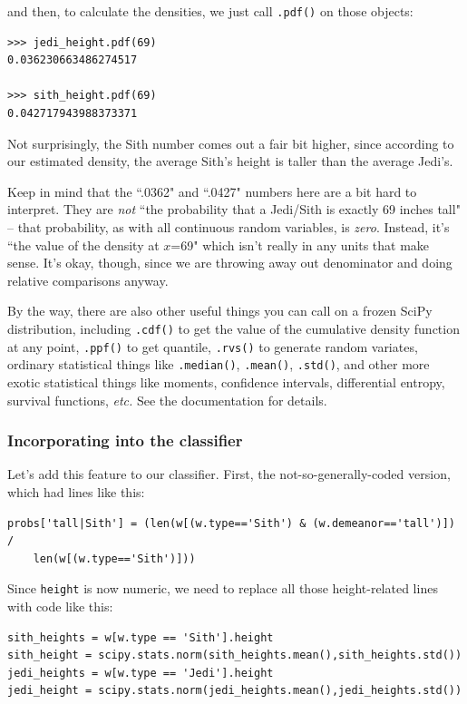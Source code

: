 \documentclass[12pt]{article}
\begin{document}
and then, to calculate the densities, we just call \texttt{.pdf()} on those
objects:

\begin{Verbatim}[fontsize=\small,samepage=true,frame=none]
>>> jedi_height.pdf(69)
0.036230663486274517

>>> sith_height.pdf(69)
0.042717943988373371
\end{Verbatim}

Not surprisingly, the Sith number comes out a fair bit higher, since according
to our estimated density, the average Sith's height is taller than the average
Jedi's.

Keep in mind that the ``.0362" and ``.0427" numbers here are a bit hard to
interpret. They are \textit{not} ``the probability that a Jedi/Sith is exactly
69 inches tall" -- that probability, as with all continuous random variables,
is \textit{zero}. Instead, it's ``the value of the density at $x$=69" which
isn't really in any units that make sense. It's okay, though, since we are
throwing away out denominator and doing relative comparisons anyway.

By the way, there are also other useful things you can call on a frozen SciPy
distribution, including \texttt{.cdf()} to get the value of the cumulative
density function at any point, \texttt{.ppf()} to get quantile,
\texttt{.rvs()} to generate random variates, ordinary statistical things like
\texttt{.median()}, \texttt{.mean()}, \texttt{.std()}, and other more exotic
statistical things like moments, confidence intervals, differential entropy,
survival functions, \textit{etc.} See the documentation for details.

\subsubsection{Incorporating into the classifier}

Let's add this feature to our classifier. First, the not-so-generally-coded
version, which had lines like this:

\footnotesize
\begin{Verbatim}[fontsize=\small,samepage=true,frame=none]
probs['tall|Sith'] = (len(w[(w.type=='Sith') & (w.demeanor=='tall')]) /
    len(w[(w.type=='Sith')]))
\end{Verbatim}
\normalsize

Since \texttt{height} is now numeric, we need to replace all those
height-related lines with code like this:

\begin{Verbatim}[fontsize=\small,samepage=true,frame=none]
sith_heights = w[w.type == 'Sith'].height
sith_height = scipy.stats.norm(sith_heights.mean(),sith_heights.std())
jedi_heights = w[w.type == 'Jedi'].height
jedi_height = scipy.stats.norm(jedi_heights.mean(),jedi_heights.std())
\end{Verbatim}
\end{document}
